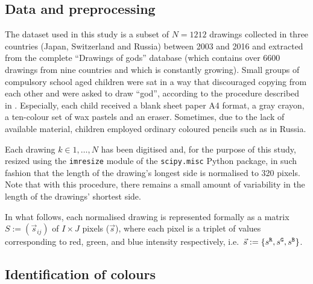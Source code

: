 \documentclass[11pt,a4paper]{article}
\begin{document}
\subsection{Data and preprocessing}
\label{sec:dataset_preprocessing}

The dataset used in this study is a subset of $N = 1212$ drawings collected in three countries (Japan, Switzerland and Russia) between 2003 and 2016 and extracted from the complete ``Drawings of gods'' database (which contains over 6600 drawings from nine countries and which is constantly growing). Small groups of compulsory school aged children were sat in a way that discouraged copying from each other and were asked to draw ``god'', according to the procedure described in \citet{DandarovaRobertDessartSerbaevaEtAl2016}. Especially, each child received a blank sheet paper A4 format, a gray crayon, a ten-colour set of wax pastels and an eraser. Sometimes, due to the lack of available material, children employed ordinary coloured pencils such as in Russia.

Each drawing $k \in 1,\dots, N$ has been digitised and, for the purpose of this study, resized using the {\tt imresize} module of the {\tt scipy.misc} Python package, in such fashion that the length of the drawing's longest side is normalised to 320 pixels. Note that with this procedure, there remains a small amount of variability in the length of the drawings' shortest side. 

In what follows, each normalised drawing is represented formally as a matrix $S := (\vec{s}_{ij})$ of $I \times J$ pixels ($\vec{s}$), where each pixel is a triplet of values corresponding to red, green, and blue intensity respectively, i.e.~$\vec{s} := \{ s^{\tt \scriptstyle R}, s^{\tt \scriptstyle G}, s^{\tt \scriptstyle B} \}$.

\subsection{Identification of colours}
\label{sec:identification}
\end{document}
